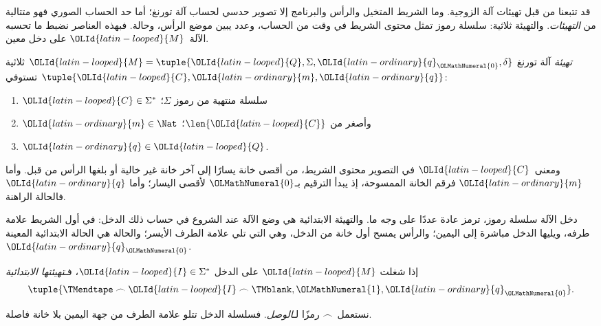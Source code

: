 \documentclass[../../../include/open-logic-section]{subfiles}
\begin{document}

\begin{explain}
قد تتبعنا من قبل تهيئات آلة الزوجية. وما الشريط المتخيل والرأس والبرنامج إلا تصوير حدسي لحساب آلة تورنغ؛ أما حد الحساب الصوري فهو متتالية من \emph{التهيئات}. والتهيئة ثلاثية: سلسلة رموز تمثل محتوى الشريط في وقت من الحساب، وعدد يبين موضع الرأس، وحالة. فبهذه العناصر نضبط ما تحسبه الآلة~$\OLId{latin-looped}{M}$ على دخل معين.
\end{explain}

\begin{defn}[التهيئة]
\emph{تهيئة} آلة تورنغ $\OLId{latin-looped}{M}=\tuple{\OLId{latin-looped}{Q},\Sigma,\OLId{latin-ordinary}{q}_\OLMathNumeral{0},\delta}$ ثلاثية $\tuple{\OLId{latin-looped}{C},\OLId{latin-ordinary}{m},\OLId{latin-ordinary}{q}}$ تستوفي:
\begin{enumerate}
\item $\OLId{latin-looped}{C} \in \Sigma^*$ سلسلة منتهية من رموز $\Sigma$؛
\item $\OLId{latin-ordinary}{m} \in \Nat$ وأصغر من $\len{\OLId{latin-looped}{C}}$؛
\item $\OLId{latin-ordinary}{q} \in \OLId{latin-looped}{Q}$.
\end{enumerate}
ومعنى~$\OLId{latin-looped}{C}$ في التصوير محتوى الشريط، من أقصى خانة يسارًا إلى آخر خانة غير خالية أو بلغها الرأس من قبل. وأما $\OLId{latin-ordinary}{m}$ فرقم الخانة الممسوحة، إذ يبدأ الترقيم بـ$\OLMathNumeral{0}$ لأقصى اليسار؛ وأما $\OLId{latin-ordinary}{q}$ فالحالة الراهنة.
\end{defn}

\begin{explain}
دخل الآلة سلسلة رموز، ترمز عادة عددًا على وجه ما. والتهيئة الابتدائية هي وضع الآلة عند الشروع في حساب ذلك الدخل: في أول الشريط علامة طرفه، ويليها الدخل مباشرة إلى اليمين؛ والرأس يمسح أول خانة من الدخل، وهي التي تلي علامة الطرف الأيسر؛ والحالة هي الحالة الابتدائية المعينة~$\OLId{latin-ordinary}{q}_\OLMathNumeral{0}$.
\end{explain}

\begin{defn}
إذا شغلت $\OLId{latin-looped}{M}$ على الدخل $\OLId{latin-looped}{I} \in \Sigma^*$، فـ\emph{تهيئتها الابتدائية}
\[
\tuple{\TMendtape \frown \OLId{latin-looped}{I} \frown \TMblank, \OLMathNumeral{1}, \OLId{latin-ordinary}{q}_\OLMathNumeral{0}}.
\]
\end{defn}

\begin{explain}
نستعمل~$\frown$ رمزًا لـ\emph{الوصل}. فسلسلة الدخل تتلو علامة الطرف من جهة اليمين بلا خانة فاصلة.
\end{explain}
\end{document}
